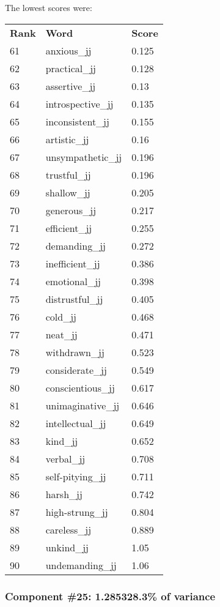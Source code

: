 \documentclass[10pt,letterpaper]{book}
\begin{document}
The lowest scores were:
\begin{tabular}{ l l l }
        \textbf{Rank} & \textbf{Word} & \textbf{Score} \\
        61 & anxious\_jj & 0.125 \\
        62 & practical\_jj & 0.128 \\
        63 & assertive\_jj & 0.13 \\
        64 & introspective\_jj & 0.135 \\
        65 & inconsistent\_jj & 0.155 \\
        66 & artistic\_jj & 0.16 \\
        67 & unsympathetic\_jj & 0.196 \\
        68 & trustful\_jj & 0.196 \\
        69 & shallow\_jj & 0.205 \\
        70 & generous\_jj & 0.217 \\
        71 & efficient\_jj & 0.255 \\
        72 & demanding\_jj & 0.272 \\
        73 & inefficient\_jj & 0.386 \\
        74 & emotional\_jj & 0.398 \\
        75 & distrustful\_jj & 0.405 \\
        76 & cold\_jj & 0.468 \\
        77 & neat\_jj & 0.471 \\
        78 & withdrawn\_jj & 0.523 \\
        79 & considerate\_jj & 0.549 \\
        80 & conscientious\_jj & 0.617 \\
        81 & unimaginative\_jj & 0.646 \\
        82 & intellectual\_jj & 0.649 \\
        83 & kind\_jj & 0.652 \\
        84 & verbal\_jj & 0.708 \\
        85 & self-pitying\_jj & 0.711 \\
        86 & harsh\_jj & 0.742 \\
        87 & high-strung\_jj & 0.804 \\
        88 & careless\_jj & 0.889 \\
        89 & unkind\_jj & 1.05 \\
        90 & undemanding\_jj & 1.06 \\
\end{tabular}
\subsubsection{Component \#25: 1.285328.3\% of variance}
\end{document}
